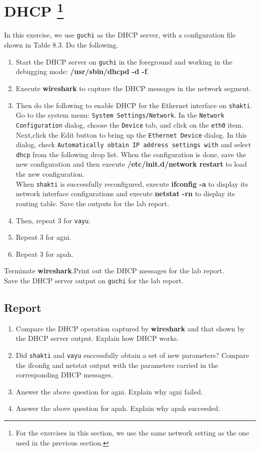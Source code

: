 \documentclass[10pt,a4paper]{article}
\numberwithin{equation}{section}
\numberwithin{figure}{section}
\numberwithin{table}{section}
\begin{document}
    \section*{DHCP \footnote{For the exercises in this section, we use the same network setting as the one used in the previous section.}}
    In this exercise, we use \texttt{guchi} as the DHCP server, with a configuration file shown in Table 8.3. Do the following.
    \begin{enumerate}
        \item Start the DHCP server on \texttt{guchi} in the foreground and working in the debugging mode: \textbf{/usr/sbin/dhcpd -d -f}.
        \item Execute \textbf{wireshark} to capture the DHCP messages in the network segment.
        \item Then do the following to enable DHCP for the Ethernet interface on \texttt{shakti}. \\
        Go to the system menu: \texttt{System Settings/Network}. In the \texttt{Network Configuration} dialog, choose the \texttt{Device} tab, and click on the \texttt{eth0} item. Next,click the Edit button to bring up the \texttt{Ethernet Device} dialog. In this dialog, check \texttt{Automatically obtain IP address settings with} and select \texttt{dhcp} from the following drop list. When the configuration is done, save the new configuration and then execute \textbf{/etc/init.d/network restart} to load the new configuration. \\
        When \texttt{shakti} is successfully reconfigured, execute \textbf{ifconfig -a} to display its network interface configurations and execute \textbf{netstat -rn} to display its routing table.
        Save the outputs for the lab report.
        \item Then, repeat 3 for \texttt{vayu}.
        \item Repeat 3 for agni.
        \item Repeat 3 for apah.
    \end{enumerate}
    Terminate \textbf{wireshark}.Print out the DHCP messages for the lab report. \\
    Save the DHCP server output on \texttt{guchi} for the lab report.

    \subsection*{Report}
    \begin{enumerate}
        \item Compare the DHCP operation captured by \textbf{wireshark} and that shown by the DHCP server output.
        Explain how DHCP works.
        \item Did \texttt{shakti} and \texttt{vayu} successfully obtain a set of new parameters?
        Compare the ifconfig and netstat output with the parameters carried in the corresponding DHCP messages.
        \item Answer the above question for agni.
        Explain why agni failed.
        \item Answer the above question for apah.
        Explain why apah succeeded.
    \end{enumerate}
\end{document}
